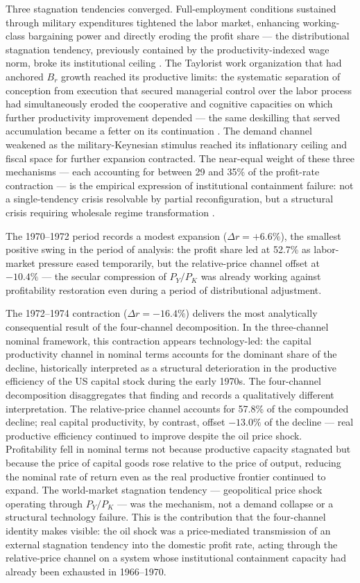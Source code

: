 \documentclass[11pt,a4paper]{article}
\begin{document}
{Three stagnation tendencies converged. Full-employment conditions sustained
through military expenditures tightened the labor market, enhancing
working-class bargaining power and directly eroding the profit share ---
the distributional stagnation tendency, previously contained by the
productivity-indexed wage norm, broke its institutional ceiling
\citep{Baker1996, Vidal2019}. The Taylorist work organization that had
anchored $B_r$ growth reached its productive limits: the systematic
separation of conception from execution that secured managerial control
over the labor process had simultaneously eroded the cooperative and
cognitive capacities on which further productivity improvement depended
--- the same deskilling that served accumulation became a fetter on its
continuation \citep{Braverman1998, Vidal2022}. The demand channel weakened
as the military-Keynesian stimulus reached its inflationary ceiling and
fiscal space for further expansion contracted. The near-equal weight of
these three mechanisms --- each accounting for between 29 and 35\% of the
profit-rate contraction --- is the empirical expression of institutional
containment failure: not a single-tendency crisis resolvable by partial
reconfiguration, but a structural crisis requiring wholesale regime
transformation \citep{Vidal2013, Vidal2019}.

The 1970--1972 period records a modest expansion ($\Delta r = +6.6\%$),
the smallest positive swing in the period of analysis: the profit share
led at 52.7\% as labor-market pressure eased temporarily, but the
relative-price channel offset at $-10.4\%$ --- the secular compression
of $P_Y/P_K$ was already working against profitability restoration even
during a period of distributional adjustment.

The 1972--1974 contraction ($\Delta r = -16.4\%$) delivers the most
analytically consequential result of the four-channel decomposition. In
the three-channel nominal framework, this contraction appears
technology-led: the capital productivity channel in nominal terms accounts
for the dominant share of the decline, historically interpreted as a
structural deterioration in the productive efficiency of the US capital
stock during the early 1970s. The four-channel decomposition disaggregates
that finding and records a qualitatively different interpretation. The
relative-price channel accounts for 57.8\% of the compounded decline;
real capital productivity, by contrast, offset $-13.0\%$ of the decline
--- real productive efficiency continued to improve despite the oil price
shock. Profitability fell in nominal terms not because productive capacity
stagnated but because the price of capital goods rose relative to the
price of output, reducing the nominal rate of return even as the real
productive frontier continued to expand. The world-market stagnation
tendency --- geopolitical price shock operating through $P_Y/P_K$ --- was
the mechanism, not a demand collapse or a structural technology failure.
This is the contribution that the four-channel identity makes visible:
the oil shock was a price-mediated transmission of an external stagnation
tendency into the domestic profit rate, acting through the relative-price
channel on a system whose institutional containment capacity had already
been exhausted in 1966--1970.

}
\end{document}
